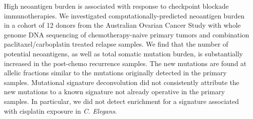 High neoantigen burden is associated with response to checkpoint blockade immunotherapies. We investigated computationally-predicted neoantigen burden in a cohort of 12 donors from the Australian Ovarian Cancer Study with whole genome DNA sequencing of chemotherapy-naive primary tumors and combination paclitaxel/carboplatin treated relapse samples. We find that the number of potential neoantigens, as well as total somatic mutation burden, is substantially increased in the post-chemo recurrence samples. The new mutations are found at allelic fractions similar to the mutations originally detected in the primary samples. Mutational signature deconvolution did not consistently attribute the new mutations to a known signature not already operative in the primary samples. In particular, we did not detect enrichment for a signature associated with cisplatin exposure in \textit{C. Elegans}.

